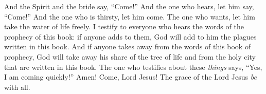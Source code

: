 \begin{biblechapter}
 And the Spirit and the bride say, “Come!” And the one who hears, let him say, “Come!” And the one who is thirsty, let him come. The one who wants, let him take the water of life freely.
 I testify to everyone who hears the words of the prophecy of this book: if anyone adds to them, God will add to him the plagues written in this book.
\verse And if anyone takes away from the words of this book of prophecy, God will take away his share of the tree of life and from the holy city that are written in this book.
\verse The one who testifies about these \textit{things} says, “Yes, I am coming quickly!” Amen! Come, Lord Jesus!
\verse The grace of the Lord Jesus \textit{be} with all.
\end{biblechapter}

